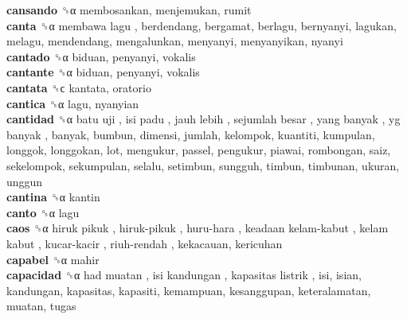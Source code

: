 \textbf{cansando} ␝α  membosankan, menjemukan, rumit  \\
\textbf{canta} ␝α   membawa lagu , berdendang, bergamat, berlagu, bernyanyi, lagukan, melagu, mendendang, mengalunkan, menyanyi, menyanyikan, nyanyi  \\
\textbf{cantado} ␝α  biduan, penyanyi, vokalis  \\
\textbf{cantante} ␝α  biduan, penyanyi, vokalis  \\
\textbf{cantata} ␝ϲ  kantata, oratorio  \\
\textbf{cantica} ␝α  lagu, nyanyian  \\
\textbf{cantidad} ␝α   batu uji ,  isi padu ,  jauh lebih ,  sejumlah besar ,  yang banyak ,  yg banyak , banyak, bumbun, dimensi, jumlah, kelompok, kuantiti, kumpulan, longgok, longgokan, lot, mengukur, passel, pengukur, piawai, rombongan, saiz, sekelompok, sekumpulan, selalu, setimbun, sungguh, timbun, timbunan, ukuran, unggun  \\
\textbf{cantina} ␝α  kantin  \\
\textbf{canto} ␝α  lagu  \\
\textbf{caos} ␝α   hiruk pikuk ,  hiruk-pikuk ,  huru-hara ,  keadaan kelam-kabut ,  kelam kabut ,  kucar-kacir ,  riuh-rendah , kekacauan, kericuhan  \\
\textbf{capabel} ␝α  mahir  \\
\textbf{capacidad} ␝α   had muatan ,  isi kandungan ,  kapasitas listrik , isi, isian, kandungan, kapasitas, kapasiti, kemampuan, kesanggupan, keteralamatan, muatan, tugas  \\
